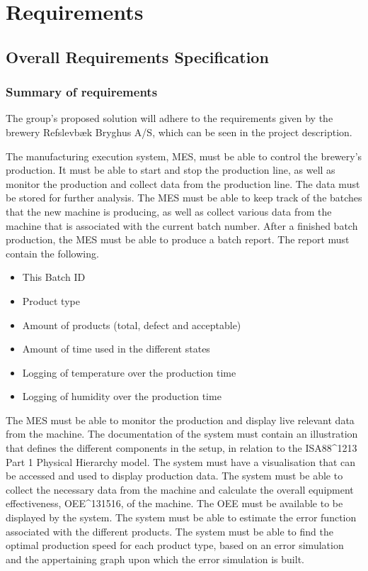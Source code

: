 \section{Requirements}

\subsection{Overall Requirements Specification}
\subsubsection{Summary of requirements}
The group's proposed solution will adhere to the requirements given by the
brewery Refslevbæk Bryghus A/S, which can be seen in the project description.

The manufacturing execution system, MES, must be able to control the brewery’s production.
It must be able to start and stop the production line,
as well as monitor the production and collect data from the production line.
The data must be stored for further analysis.
The MES must be able to keep track of the batches that the new machine is producing,
as well as collect various data from the machine that is associated with the current batch number.
After a finished batch production, the MES must be able to produce a batch report.
The report must contain the following.

\begin{itemize}
    \item This Batch ID
    \item Product type
    \item Amount of products (total, defect and acceptable)
    \item Amount of time used in the different states
    \item Logging of temperature over the production time
    \item Logging of humidity over the production time
\end{itemize}

The MES must be able to monitor the production and display live relevant data
from the machine. The documentation of the system must contain an illustration
that defines the different components in the setup, in relation to the
ISA88\^{}1213 Part 1 Physical Hierarchy model. The system must have a
visualisation that can be accessed and used to display production data. The
system must be able to collect the necessary data from the machine and calculate
the overall equipment effectiveness, OEE\^{}131516, of the machine. The OEE must
be available to be displayed by the system. The system must be able to estimate
the error function associated with the different products. The system must be
able to find the optimal production speed for each product type, based on an
error simulation and the appertaining graph upon which the error simulation is
built.

